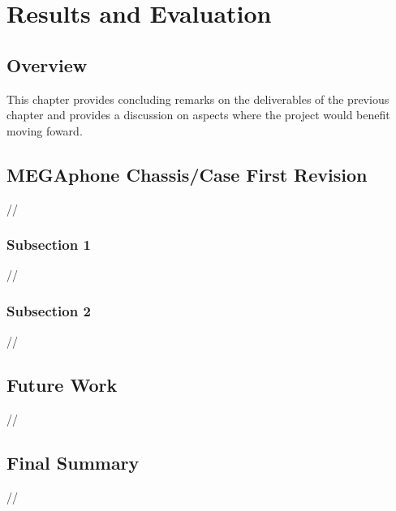 
\chapter{Results and Evaluation} %

\label{Chapter5} %


\section{Overview}
This chapter provides concluding remarks on the deliverables of the previous chapter and provides a discussion on aspects where the project would benefit moving foward.


\section{MEGAphone Chassis/Case First Revision}
//

\subsection{Subsection 1}
//

\subsection{Subsection 2}
//

\section{Future Work}
//


\section{Final Summary}
//